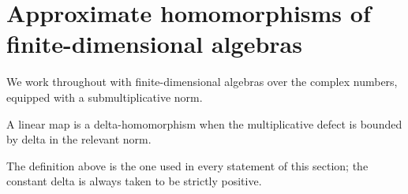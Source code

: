 \section{Approximate homomorphisms of finite-dimensional algebras}

We work throughout with finite-dimensional algebras over the complex numbers,
equipped with a submultiplicative norm.

\begin{definition}
A linear map is a delta-homomorphism when the multiplicative defect is bounded
by delta in the relevant norm.
\end{definition}

The definition above is the one used in every statement of this section; the
constant delta is always taken to be strictly positive.
